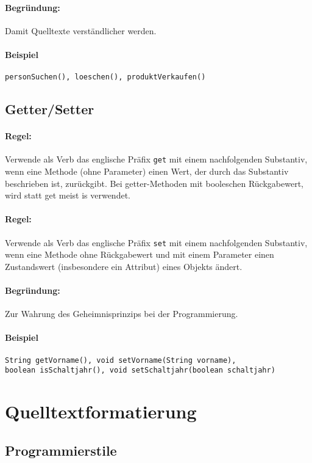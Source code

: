 \paragraph{Begründung:} Damit Quelltexte verständlicher werden.

\paragraph{Beispiel}
\texttt{personSuchen(), loeschen(), produktVerkaufen()}

\subsection{Getter/Setter}

\paragraph{Regel:} Verwende als Verb das englische Präfix \texttt{get} mit einem nachfolgenden Substantiv, wenn eine Methode (ohne Parameter) einen Wert, der durch das Substantiv beschrieben ist, zurückgibt. Bei getter-Methoden mit booleschen Rückgabewert, wird statt get meist is verwendet.
\paragraph{Regel:} Verwende als Verb das englische Präfix \texttt{set} mit einem nachfolgenden Substantiv, wenn eine Methode ohne Rückgabewert und mit einem Parameter einen Zustandswert (insbesondere ein Attribut) eines Objekts ändert.
\paragraph{Begründung:} Zur Wahrung des Geheimnisprinzips bei der Programmierung.

\paragraph{Beispiel}
\texttt{String getVorname(), void setVorname(String vorname),\\boolean isSchaltjahr(), void setSchaltjahr(boolean schaltjahr)}

\section{Quelltextformatierung}

\subsection{Programmierstile}

